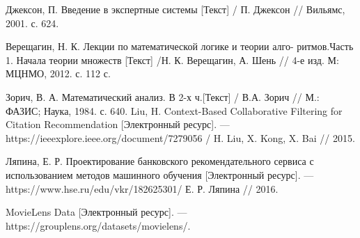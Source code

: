\begin{thebibliography}{119}
 Джексон, П. Введение в экспертные системы [Текст]   / П. Джексон // Вильямс, 2001. с. 624.

 Верещагин, Н. К. Лекции по математической логике и теории алго-
ритмов.Часть 1. Начала теории множеств [Текст]  /Н. К. Верещагин, А. Шень // 4-е изд. М: МЦНМО, 2012. с. 112
с.

 Зорич, В. А. Математический анализ. В 2-х ч.[Текст]   /  В.А. Зорич // М.: ФАЗИС; Наука,
1984. с. 640.
 Liu, H. Context-Based Collaborative Filtering for Citation
Recommendation [Электронный ресурс]. ---  https://ieeexplore.ieee.org/document/7279056
/ H. Liu, X. Kong, X. Bai // 2015.

 Ляпина, Е. Р. Проектирование банковского рекомендательного сервиса с
использованием методов машинного обучения [Электронный ресурс]. ---
https://www.hse.ru/edu/vkr/182625301/ Е. Р. Ляпина // 2016.

 MovieLens Data [Электронный ресурс]. ---
https://grouplens.org/datasets/movielens/.

\end{thebibliography}
